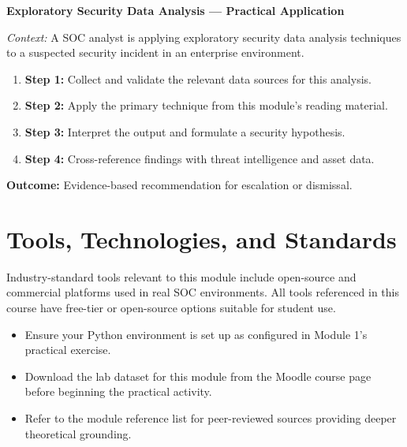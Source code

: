 \documentclass[12pt,a4paper]{article}
\begin{document}
\begin{example}
\textbf{Exploratory Security Data Analysis --- Practical Application}

\textit{Context:} A SOC analyst is applying exploratory security data analysis techniques to a suspected security incident in an enterprise environment.

\begin{enumerate}
    \item \textbf{Step 1:} Collect and validate the relevant data sources for this analysis.
    \item \textbf{Step 2:} Apply the primary technique from this module's reading material.
    \item \textbf{Step 3:} Interpret the output and formulate a security hypothesis.
    \item \textbf{Step 4:} Cross-reference findings with threat intelligence and asset data.
\end{enumerate}

\textbf{Outcome:} Evidence-based recommendation for escalation or dismissal.
\end{example}

\section{Tools, Technologies, and Standards}

Industry-standard tools relevant to this module include open-source and commercial platforms used in real SOC environments. All tools referenced in this course have free-tier or open-source options suitable for student use.

\begin{itemize}
    \item Ensure your Python environment is set up as configured in Module 1's practical exercise.
    \item Download the lab dataset for this module from the Moodle course page before beginning the practical activity.
    \item Refer to the module reference list for peer-reviewed sources providing deeper theoretical grounding.
\end{itemize}
\end{document}
